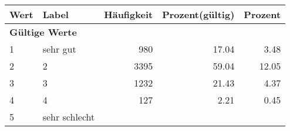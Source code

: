      \begin{longtable}{lXrrr}
     \toprule
     \textbf{Wert} & \textbf{Label} & \textbf{Häufigkeit} & \textbf{Prozent(gültig)} & \textbf{Prozent} \\
     \endhead
     \midrule
     \multicolumn{5}{l}{\textbf{Gültige Werte}}\\

     1 &
     \multicolumn{1}{X}{ sehr gut   } &


       \num{980} &
       \num[round-mode=places,round-precision=2]{17.04} &
         \num[round-mode=places,round-precision=2]{3.48} \\

     2 &
     \multicolumn{1}{X}{ 2   } &


       \num{3395} &
       \num[round-mode=places,round-precision=2]{59.04} &
         \num[round-mode=places,round-precision=2]{12.05} \\

     3 &
     \multicolumn{1}{X}{ 3   } &


       \num{1232} &
       \num[round-mode=places,round-precision=2]{21.43} &
         \num[round-mode=places,round-precision=2]{4.37} \\

     4 &
     \multicolumn{1}{X}{ 4   } &


       \num{127} &
       \num[round-mode=places,round-precision=2]{2.21} &
         \num[round-mode=places,round-precision=2]{0.45} \\

     5 &
     \multicolumn{1}{X}{ sehr schlecht   } &



\end{longtable}
